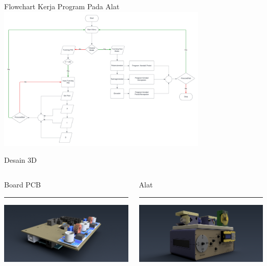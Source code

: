 \documentclass[10pt,xcolor={dvipsnames}]{beamer}
\begin{document}
\begin{frame}{Flowchart Kerja Program Pada Alat}
	\centering
	\includegraphics[width=10cm]{Gambar Lain/Flowchart Sistem.png}
\end{frame}

\begin{frame}{Desain 3D}
	\begin{columns}[T] %
		\begin{column}{0.48\textwidth}
			Board PCB
			\color{black}\rule{\linewidth}{4pt}
			\includegraphics[width=7.5cm]{Render/Main Board_v3 (Home).png}
		\end{column}%
		\hfill%
		\begin{column}{0.48\textwidth}
			Alat
			\color{blue}\rule{\linewidth}{4pt}
			\begin{center}
				\includegraphics[width=7.5cm]{Render/Feedback Actuator UNIT ES151(Home).png}
			\end{center}
		\end{column}
	\end{columns}
\end{frame}
\end{document}
